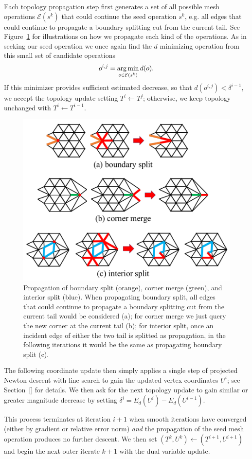 Each topology propagation step first generates a set of all possible mesh operations $\mathcal{E}(s^k)$ that could continue the seed operation $s^k$, e.g. all edges that could continue to propagate a boundary splitting cut from the current tail. See Figure\ \ref{fig:propagation} for illustrations on how we propagate each kind of the operations.
As in seeking our seed operation we once again find the $d$ minimizing operation from this small set of candidate operations
\begin{align}
\label{eq:minE}
o^{i,j} = \operatorname*{arg\,min}_{o \in \mathcal{E}(s^k)} d(o).
\end{align}
If this minimizer provides sufficient estimated decrease, so that $d(o^{i,j}) < \delta^{i-1}$, we accept the topology update setting $T^i \leftarrow T^j$; otherwise, we keep topology unchanged with $T^i \leftarrow T^{i-1}.$

\begin{figure}[t]
\centering
\includegraphics[width=0.8\linewidth]{fig/propagation.png}
\caption{Propagation of boundary split (orange), corner merge (green), and interior split (blue). When propagating boundary split, all edges that could continue to propagate a boundary splitting cut from the current tail would be considered (a); for corner merge we just query the new corner at the current tail (b); for interior split, once an incident edge of either the two tail is splitted as propagation, in the following iterations it would be the same as propagating boundary split (c).}
\label{fig:propagation}
\end{figure}

The following coordinate update then simply applies a single step of projected Newton descent with line search to gain the updated vertex coordinates $U^i$; see Section~\ref{} for details. We then ask for the next topology update to gain similar or greater magnitude decrease by setting $\delta^i = E_d(U^i) - E_d(U^{i-1})$.

This process terminates at iteration $i+1$ when smooth iterations have converged (either by gradient or relative error norm) \emph{and} the propagation of the seed mesh operation produces no further descent. We then set $(T^k,U^k) \leftarrow (T^{i+1},U^{i+1})$ and begin the next outer iterate $k+1$ with the dual variable update. 


